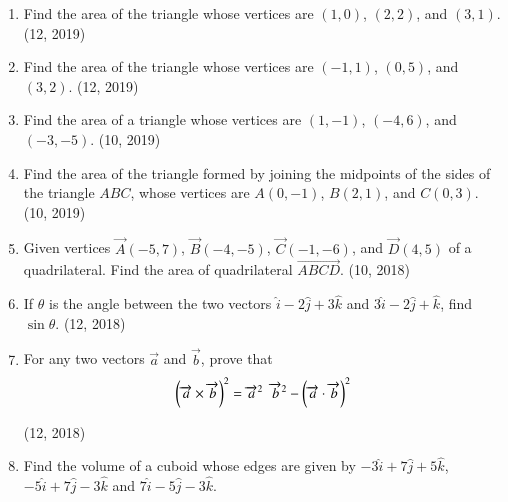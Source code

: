 \begin{enumerate}[label=\thesubsection.\arabic*,ref=\thesubsection.\theenumi]
	\item Find the area of the triangle whose vertices are $(1, 0)$, $(2, 2)$, and $(3, 1)$. \hfill (12, 2019)
	\item Find the area of the triangle whose vertices are $(-1, 1)$, $(0, 5)$, and $(3, 2)$. \hfill (12, 2019)
\item Find the area of a triangle whose vertices are $(1, -1)$, $(-4, 6)$, and $(-3, -5)$. \hfill (10, 2019)
\item Find the area of the triangle formed by joining the midpoints of the sides of the triangle $ABC$, whose vertices are $A(0, -1)$, $B(2, 1)$, and $C(0, 3)$. \hfill (10, 2019)
    \item Given vertices $\vec{A}(-5,7)$, $\vec{B}(-4,-5)$, $\vec{C}(-1,-6)$, and $\vec{D}(4,5)$ of a quadrilateral. Find the area of quadrilateral $\vec{ABCD}$. \hfill (10, 2018)
\item If $\theta$ is the angle between the two vectors $\hat{i} - 2\hat{j} + 3\hat{k}$ and $3\hat{i} - 2\hat{j} + \hat{k}$, find $\sin \theta$. \hfill (12, 2018)
\item For any two vectors $\overrightarrow{a}$ and $\overrightarrow{b}$, prove that
    \begin{align*}
    \left({\overrightarrow{a} \times \overrightarrow{b}}\right)^{2} = {\overrightarrow{a}^{2}}~~{\overrightarrow{b}^{2}} - \left({\overrightarrow{a} \cdot \overrightarrow{b}}\right)^{2} 
    \end{align*}

\hfill (12, 2018) 
\item Find the volume of a cuboid whose edges are given by $-3\hat{i}+7\hat{j}+5\hat{k}$,$-5\hat{i}+7\hat{j}-3\hat{k}$ and $7\hat{i}-5\hat{j}-3\hat{k}$.


\end{enumerate}
